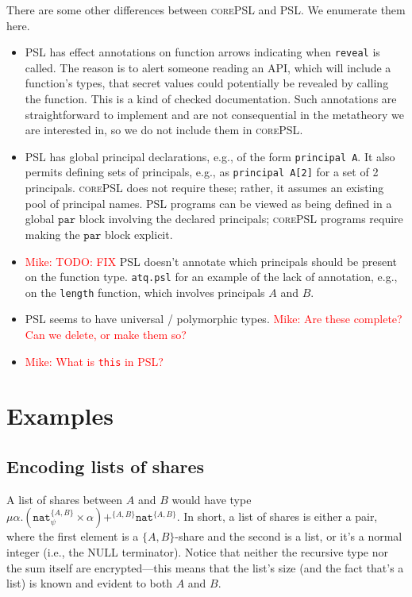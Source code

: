 \documentclass[10pt]{article}
\newcommand{\kw}[1]{\ensuremath{\mathtt{#1}}}
\newcommand{\tnat}{\ensuremath{\mathtt{nat}}}
\newcommand{\tpair}[2]{\ensuremath{{#1} \times {#2}}}
\newcommand{\tsum}[3]{\ensuremath{{#1} +^{#3} {#2}}}
\newcommand{\trec}[2]{\ensuremath{\mu {#1}.{#2}}}
\newcommand{\lang}{\textsc{corePSL}\xspace}
\newcommand{\mwh}[1]{\textcolor{red}{Mike: #1}}
\begin{document}
There are some other differences between \lang and PSL. We enumerate
them here. 
\begin{itemize}
\item PSL has effect annotations on function arrows indicating when
  \texttt{reveal} is called. The reason is to alert someone reading an
  API, which will include a function's types, that secret values could
  potentially be revealed by calling the function. This is a kind of
  checked documentation. Such annotations are straightforward to
  implement and are not consequential in the metatheory we are
  interested in, so we do not include them in \lang.
\item PSL has global principal declarations, e.g., of the form
  \texttt{principal A}. It also permits defining sets of principals,
  e.g., as \texttt{principal A[2]} for a set of 2 principals. \lang
  does not require these; rather, it assumes an existing pool of
  principal names. PSL programs can 
  be viewed as being defined in a global $\kw{par}$ block involving
  the declared principals; \lang programs require making the
  $\kw{par}$ block explicit.
\item \mwh{TODO: FIX} PSL doesn't annotate which principals should be present on the
  function type. \texttt{atq.psl} for an example of the lack
  of annotation, e.g., on the \texttt{length} function, which involves
  principals $A$ and $B$. 
\item PSL seems to have universal / polymorphic types. \mwh{Are these
    complete? Can we delete, or make them so?}
\item \mwh{What is \texttt{this} in PSL?}
\end{itemize}

\section{Examples}
\label{sec:examples}

\subsection{Encoding lists of shares}

\newcommand{\twoprins}{\ensuremath{\{A,B\}}}

A list of shares between $A$ and $B$ would have type
$\trec{\alpha}{\tsum{(\tpair{\tnat^{\twoprins}_\psi}{\alpha})}{\tnat^{\twoprins}}{\twoprins}}$. In
short, a list of shares is either a pair, where the first element is a
\twoprins-share and the second is a list, or it's a normal integer
(i.e., the NULL terminator). Notice that neither the recursive type
nor the sum itself are encrypted---this means that the list's size
(and the fact that's a list) is known and evident to both $A$ and $B$.
\end{document}
